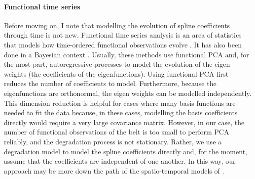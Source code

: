 \paragraph{Functional time series}
Before moving on, I note that modelling the evolution of spline coefficients through time is not new. Functional time series analysis is an area of statistics that models how time-ordered functional observations evolve \citep{hormann_2012}. It has also been done in a Bayesian context \citep{kowal_2017}. Usually, these methods use functional PCA \citep[p. 16]{ramsay_2009} and, for the most part, autoregressive processes to model the evolution of the eigen weights (the coefficients of the eigenfunctions). Using functional PCA first reduces the number of coefficients to model. Furthermore, because the eigenfunctions are orthonormal, the eigen weights can be modelled independently. This dimension reduction is helpful for cases where many basis functions are needed to fit the data because, in these cases, modelling the basis coefficients directly would require a very large covariance matrix. However, in our case, the number of functional observations of the belt is too small to perform PCA reliably, and the degradation process is not stationary. Rather, we use a degradation model to model the spline coefficients directly and, for the moment, assume that the coefficients are independent of one another. In this way, our approach may be more down the path of the spatio-temporal models of \citet[p. 218-224]{wikle_2019}.

